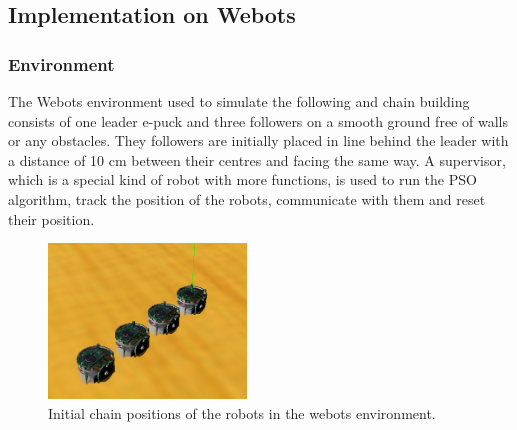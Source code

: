 \documentclass[a4paper, 10pt, conference]{ieeeconf}      %
\begin{document}



\addtolength{\textheight}{-3cm}   %
                                  
\subsection{Implementation on Webots}

\subsubsection{Environment}
The Webots environment used to simulate the following and chain building consists of one leader e-puck and three followers on a smooth ground free of walls or any obstacles. They followers are initially placed in line behind the leader with a distance of 10 cm between their centres and facing the same way. A supervisor, which is a special kind of robot with more functions, is used to run the PSO algorithm, track the position of the robots, communicate with them and reset their position.

\begin{figure}[thpb]
      \centering
      \includegraphics[width = 0.47\textwidth]{images/Initial_positions.PNG}
      \caption{Initial chain positions of the robots in the webots environment.}
      \label{fig:initial_pos}
\end{figure}
\end{document}
